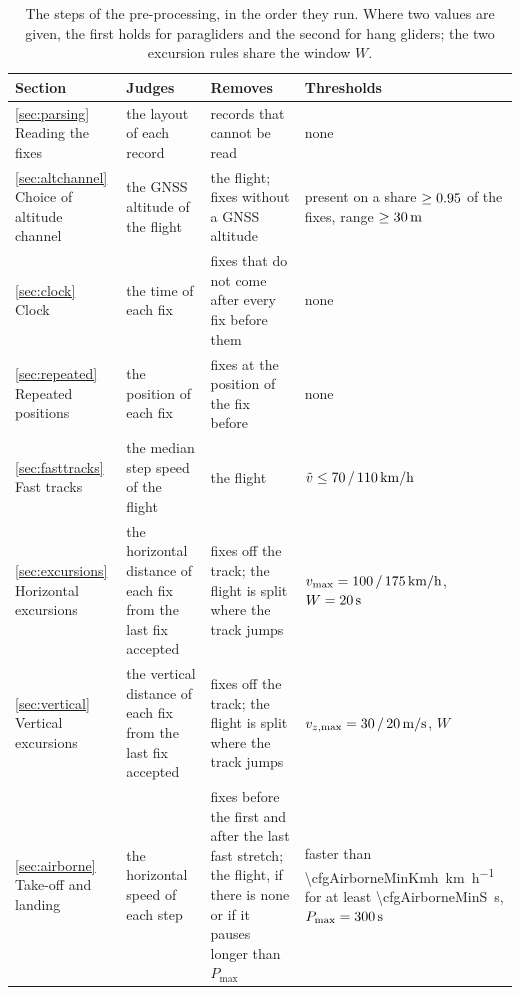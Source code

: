 \begin{table}[htbp]
\centering\small
\caption{The steps of the pre-processing, in the order they run. Where two values are
given, the first holds for paragliders and the second for hang gliders; the two
excursion rules share the window $W$.}
\label{tab:preproc-steps}
\begin{tabularx}{\textwidth}{@{}>{\raggedright\arraybackslash}p{3.4cm}
  >{\raggedright\arraybackslash}X>{\raggedright\arraybackslash}X
  >{\raggedright\arraybackslash}p{3.4cm}@{}}
\toprule
Section & Judges & Removes & Thresholds \\
\midrule
\ref{sec:parsing} Reading the fixes & the layout of each record & records that cannot be
  read & none \\
\ref{sec:altchannel} Choice of altitude channel & the GNSS altitude of the flight & the
  flight; fixes without a GNSS altitude & present on a share
  $\geq0.95$ of the fixes, range
  $\geq\SI{30}{\metre}$ \\
\ref{sec:clock} Clock & the time of each fix & fixes that do not come after every fix
  before them & none \\
\ref{sec:repeated} Repeated positions & the position of each fix & fixes at the
  position of the fix before & none \\
\ref{sec:fasttracks} Fast tracks & the median step speed of the flight & the flight &
  $\tilde v\leq\cfgSpeedMedianMaxKmhPara\,/\,%
  \SI[per-mode=symbol]{\cfgSpeedMedianMaxKmhHang}{\kilo\metre\per\hour}$ \\
\ref{sec:excursions} Horizontal excursions & the horizontal distance of each fix from
  the last fix accepted & fixes off the track; the flight is split where the track
  jumps & $v_{\max}=\cfgSpeedMaxKmhPara\,/\,%
  \SI[per-mode=symbol]{\cfgSpeedMaxKmhHang}{\kilo\metre\per\hour}$,
  $W=\SI{20}{\second}$ \\
\ref{sec:vertical} Vertical excursions & the vertical distance of each fix from the
  last fix accepted & fixes off the track; the flight is split where the track jumps &
  $v_{z,\max}=\cfgVerticalMaxMsPara\,/\,%
  \SI[per-mode=symbol]{\cfgVerticalMaxMsHang}{\metre\per\second}$, $W$ \\
\ref{sec:airborne} Take-off and landing & the horizontal speed of each step & fixes before
  the first and after the last fast stretch; the flight, if there is none or if it pauses
  longer than $P_{\max}$ & faster than
  \SI[per-mode=symbol]{\cfgAirborneMinKmh}{\kilo\metre\per\hour} for at least
  \SI{\cfgAirborneMinS}{\second}, $P_{\max}=\SI{300}{\second}$ \\
\bottomrule
\end{tabularx}
\end{table}


